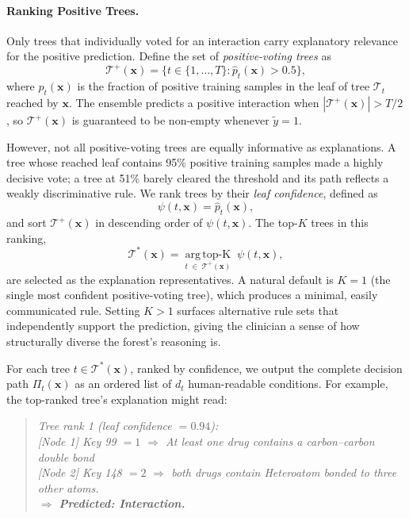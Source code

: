 \documentclass[letterpaper]{article} %
\begin{document}
\paragraph{Ranking Positive Trees.}
Only trees that individually voted for an interaction carry explanatory
relevance for the positive prediction.  Define the set of
\emph{positive-voting trees} as
\begin{equation}
    \mathcal{T}^{+}(\mathbf{x}) =
    \bigl\{t \in \{1,\ldots,T\} : \hat{p}_t(\mathbf{x}) > 0.5\bigr\},
    \label{eq:pos_trees}
\end{equation}
where $\hat{p}_t(\mathbf{x})$ is the fraction of positive training
samples in the leaf of tree $\mathcal{T}_t$ reached by $\mathbf{x}$.
The ensemble predicts a positive interaction when
$|\mathcal{T}^{+}(\mathbf{x})| > T/2$, so $\mathcal{T}^{+}(\mathbf{x})$
is guaranteed to be non-empty whenever $\tilde{y} = 1$.
 
However, not all positive-voting trees are equally informative as explanations.
A tree whose reached leaf contains 95\% positive training samples made
a highly decisive vote; a tree at 51\% barely cleared the threshold and
its path reflects a weakly discriminative rule.  We rank trees by their
\emph{leaf confidence}, defined as
\begin{equation}
    \psi(t, \mathbf{x}) = \hat{p}_t(\mathbf{x}),
    \label{eq:tree_score}
\end{equation}
and sort $\mathcal{T}^{+}(\mathbf{x})$ in descending order of
$\psi(t, \mathbf{x})$.  The top-$K$ trees in this ranking,
\begin{equation}
    \mathcal{T}^{*}(\mathbf{x}) =
    \operatorname*{arg\,top\text{-}K}_{t\;\in\;\mathcal{T}^{+}(\mathbf{x})}
    \;\psi(t, \mathbf{x}),
    \label{eq:top_k}
\end{equation}
are selected as the explanation representatives.
A natural default is $K = 1$ (the single most confident positive-voting
tree), which produces a minimal, easily communicated rule.
Setting $K > 1$ surfaces alternative rule sets that independently
support the prediction, giving the clinician a sense of how
structurally diverse the forest's reasoning is.
 
For each tree $t \in \mathcal{T}^{*}(\mathbf{x})$, ranked by confidence,
we output the complete decision path $\Pi_t(\mathbf{x})$ as an ordered
list of $d_t$ human-readable conditions.  For example, the top-ranked
tree's explanation might read:
\begin{quote}
\emph{Tree rank 1 (leaf confidence $= 0.94$):}\\
\emph{[Node 1]\; Key 99 $= 1$\;
$\Rightarrow$ At least one drug contains a carbon–carbon double bond}\\
\emph{[Node 2]\; Key 148 $= 2$\;
$\Rightarrow$ both drugs contain Heteroatom bonded to three other atoms.}\\
\emph{$\Rightarrow$ \textbf{Predicted: Interaction.}}
\end{quote}
\end{document}
